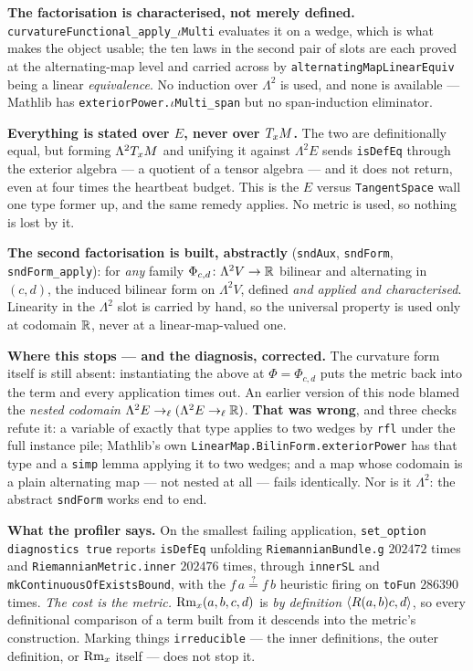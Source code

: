 \begin{lemma}
  \textbf{The factorisation is characterised, not merely defined.}
  \texttt{curvatureFunctional\_apply\_}$\iota$\texttt{Multi} evaluates it on a wedge, which is
  what makes the object usable; the ten laws in the second pair of slots are each
  proved at the alternating-map level and carried across by
  \texttt{alternatingMapLinearEquiv} being a linear \emph{equivalence}. No
  induction over $\Lambda^2$ is used, and none is available --- Mathlib has
  \texttt{exteriorPower.}$\iota$\texttt{Multi\_span} but no span-induction eliminator.

  \textbf{Everything is stated over $E$, never over $T_xM$.} The two are
  definitionally equal, but forming $\Lambda^2 T_xM$ and unifying it against
  $\Lambda^2 E$ sends \texttt{isDefEq} through the exterior algebra --- a quotient
  of a tensor algebra --- and it does not return, even at four times the heartbeat
  budget. This is the $E$ versus \texttt{TangentSpace} wall one type former up, and
  the same remedy applies. No metric is used, so nothing is lost by it.

  \textbf{The second factorisation is built, abstractly}
  (\texttt{sndAux}, \texttt{sndForm}, \texttt{sndForm\_apply}): for \emph{any} family
  $\Phi_{c,d} \colon \Lambda^2 V \to \mathbb{R}$ bilinear and alternating in $(c,d)$, the induced
  bilinear form on $\Lambda^2 V$, defined \emph{and applied and characterised}. Linearity in
  the $\Lambda^2$ slot is carried by hand, so the universal property is used only at codomain
  $\mathbb{R}$, never at a linear-map-valued one.

  \textbf{Where this stops --- and the diagnosis, corrected.} The curvature form itself is
  still absent: instantiating the above at $\Phi = \Phi_{c,d}$ puts the metric back into the
  term and every application times out. An earlier version of this node blamed the
  \emph{nested codomain} $\Lambda^2 E \to_\ell (\Lambda^2 E \to_\ell \mathbb{R})$. \textbf{That was
  wrong}, and three checks refute it: a variable of exactly that type applies to two wedges by
  \texttt{rfl} under the full instance pile; Mathlib's own
  \texttt{LinearMap.BilinForm.exteriorPower} has that type and a \texttt{simp} lemma applying
  it to two wedges; and a map whose codomain is a plain alternating map --- not nested at all
  --- fails identically. Nor is it $\Lambda^2$: the abstract \texttt{sndForm} works end to end.

  \textbf{What the profiler says.} On the smallest failing application,
  \texttt{set\_option diagnostics true} reports \texttt{isDefEq} unfolding
  \texttt{RiemannianBundle.g} $202472$ times and \texttt{RiemannianMetric.inner} $202476$
  times, through \texttt{innerSL} and \texttt{mkContinuousOfExistsBound}, with the
  $f\,a \overset{?}{=} f\,b$ heuristic firing on \texttt{toFun} $286390$ times. \emph{The cost
  is the metric.} $\operatorname{Rm}_x(a,b,c,d)$ is \emph{by definition} $\langle R(a,b)c, d\rangle$, so
  every definitional comparison of a term built from it descends into the metric's
  construction. Marking things \texttt{irreducible} --- the inner definitions, the outer
  definition, or $\operatorname{Rm}_x$ itself --- does not stop it.


\end{lemma}
